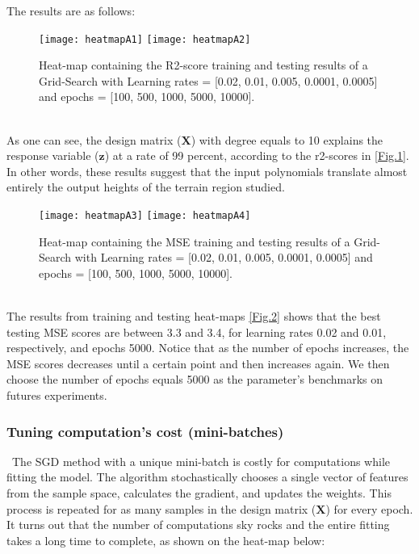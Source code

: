 The results are as follows:\\

\begin{figure}[H]
\label{fig:figA1}
\centering
\texttt{[image: heatmapA1]}
\texttt{[image: heatmapA2]}
\caption{Heat-map containing the R2-score training and testing results of a Grid-Search with Learning rates = [0.02, 0.01, 0.005, 0.0001, 0.0005] and epochs = [100, 500, 1000, 5000, 10000].}
\end{figure}\\

As one can see, the design matrix ($\boldsymbol{X}$) with degree equals to 10 explains the response variable ($\boldsymbol{z}$) at a rate of 99 percent, according to the r2-scores in \hyperref[fig:figA1]{[Fig.1]}. In other words, these results suggest that the input polynomials translate almost entirely the output heights of the terrain region studied.\\

\begin{figure}[H]
\label{fig:figA2}
\centering
\texttt{[image: heatmapA3]}
\texttt{[image: heatmapA4]}
\caption{Heat-map containing the MSE training and testing results of a Grid-Search with Learning rates = [0.02, 0.01, 0.005, 0.0001, 0.0005] and epochs = [100, 500, 1000, 5000, 10000]. }
\end{figure}\\

The results from training and testing heat-maps \hyperref[fig:fidA2]{[Fig.2]} shows that the best testing MSE scores are between 3.3 and 3.4, for learning rates 0.02 and 0.01, respectively, and epochs 5000. Notice that as the number of epochs increases, the MSE scores decreases until a certain point and then increases again. We then choose the number of epochs equals 5000 as the parameter's benchmarks on futures experiments.\\

\subsubsection{Tuning computation's cost (mini-batches)}
\label{chap:Tuning computation's cost (mini-batches)}

\qquad \, The SGD method with a unique mini-batch is costly for computations while fitting the model. The algorithm stochastically chooses a single vector of features from the sample space, calculates the gradient, and updates the weights. This process is repeated for as many samples in the design matrix ($\boldsymbol{X}$) for every epoch. It turns out that the number of computations sky rocks and the entire fitting takes a long time to complete, as shown on the heat-map below:

